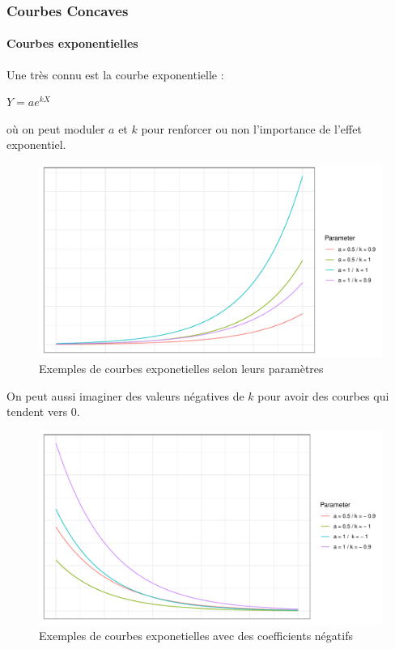 \documentclass[
]{article}
\begin{document}
\hypertarget{courbes-concaves}{%
\subsubsection{Courbes Concaves}\label{courbes-concaves}}

\hypertarget{courbes-exponentielles}{%
\paragraph{Courbes exponentielles}\label{courbes-exponentielles}}

Une très connu est la courbe exponentielle :

\(Y=ae^{kX}\)

où on peut moduler \(a\) et \(k\) pour renforcer ou non l'importance de
l'effet exponentiel.

\begin{figure}
\centering
\includegraphics{Learning_R_files/figure-latex/unnamed-chunk-9-1.pdf}
\caption{Exemples de courbes exponetielles selon leurs paramètres}
\end{figure}

On peut aussi imaginer des valeurs négatives de \(k\) pour avoir des
courbes qui tendent vers 0.

\begin{figure}
\centering
\includegraphics{Learning_R_files/figure-latex/unnamed-chunk-10-1.pdf}
\caption{Exemples de courbes exponetielles avec des coefficients
négatifs}
\end{figure}
\end{document}
